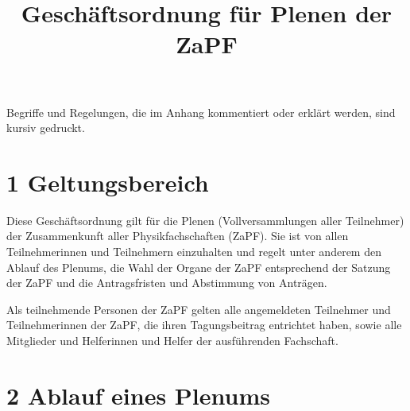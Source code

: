\documentclass[12pt,oneside]{scrartcl}
\title{\phantomsection%
  Geschäftsordnung für Plenen der ZaPF%
  \label{geschaftsordnung-fur-plenen-der-zapf}}
\author{}
\date{}
\begin{document}
\maketitle

Begriffe und Regelungen, die im Anhang kommentiert oder erklärt werden, sind
kursiv gedruckt.


\section{1 Geltungsbereich%
  \label{geltungsbereich}%
}

Diese Geschäftsordnung gilt für die Plenen (Vollversammlungen aller Teilnehmer)
der Zusammenkunft aller Physikfachschaften (ZaPF).
Sie ist von allen Teilnehmerinnen und Teilnehmern einzuhalten und regelt unter
anderem den Ablauf des Plenums, die Wahl der Organe der ZaPF entsprechend der
Satzung der ZaPF und die Antragsfristen und Abstimmung von Anträgen.

Als teilnehmende Personen der ZaPF gelten alle angemeldeten Teilnehmer und
Teilnehmerinnen der ZaPF, die ihren Tagungsbeitrag entrichtet haben, sowie alle
Mitglieder und Helferinnen und Helfer der ausführenden Fachschaft.


\section{2 Ablauf eines Plenums%
  \label{ablauf-eines-plenums}%
}
\end{document}
